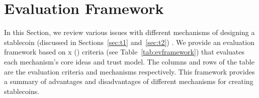 
\section{Evaluation Framework}

In this Section, we review various issues with different mechanisms of designing a stablecoin (discussed in Sections~\ref{sec:t1} and~\ref{sec:t2}) . We provide an evaluation framework based on x () criteria (see Table~\ref{tab:evframework}) that evaluates each mechanism's core ideas and trust model. The columns and rows of the table are the evaluation criteria and mechanisms respectively. This framework provides a summary of advantages and disadvantages of different mechanisms for creating stablecoins.


